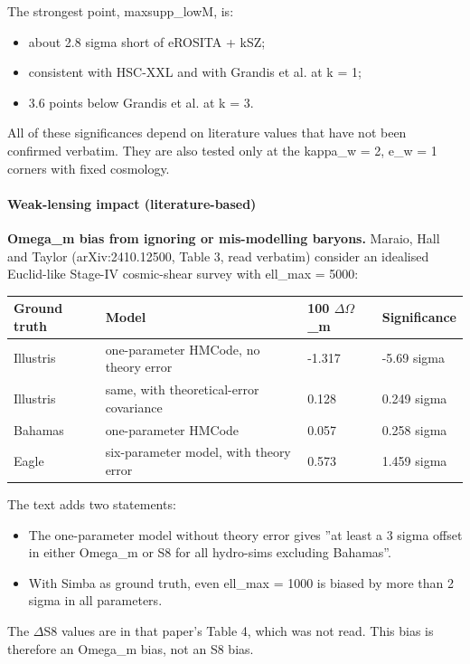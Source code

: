 \documentclass[11pt,a4paper]{article}
\begin{document}
The strongest point, maxsupp\_lowM, is:

\begin{itemize}
  \item about 2.8 sigma short of eROSITA + kSZ;
  \item consistent with HSC-XXL and with Grandis et al. at k = 1;
  \item 3.6 points below Grandis et al. at k = 3.
\end{itemize}
All of these significances depend on literature values that have not been confirmed verbatim. They are also tested only at the kappa\_w = 2, e\_w = 1 corners with fixed cosmology.

\paragraph{Weak-lensing impact (literature-based)}
\textbf{Omega\_m bias from ignoring or mis-modelling baryons.} Maraio, Hall and Taylor (arXiv:2410.12500, Table 3, read verbatim) consider an idealised Euclid-like Stage-IV cosmic-shear survey with ell\_max = 5000:

\begin{longtable}{@{}p{}p{}p{}p{}@{}}
\toprule
\textbf{Ground truth} & \textbf{Model} & \textbf{100 $\Delta$$\Omega$\_m} & \textbf{Significance} \\ \midrule \endhead
Illustris & one-parameter HMCode, no theory error & -1.317 & -5.69 sigma \\
Illustris & same, with theoretical-error covariance & 0.128 & 0.249 sigma \\
Bahamas & one-parameter HMCode & 0.057 & 0.258 sigma \\
Eagle & six-parameter model, with theory error & 0.573 & 1.459 sigma \\
\bottomrule\end{longtable}
The text adds two statements:

\begin{itemize}
  \item The one-parameter model without theory error gives ''at least a 3 sigma offset in either Omega\_m or S8 for all hydro-sims excluding Bahamas''.
  \item With Simba as ground truth, even ell\_max = 1000 is biased by more than 2 sigma in all parameters.
\end{itemize}
The $\Delta$S8 values are in that paper's Table 4, which was not read. This bias is therefore an Omega\_m bias, not an S8 bias.
\end{document}
